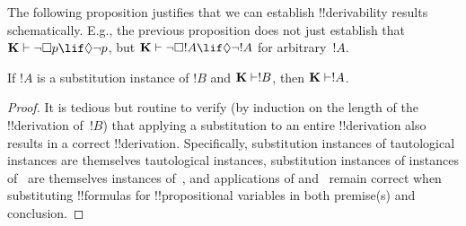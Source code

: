 \documentclass[../../../include/open-logic-section]{subfiles}
\begin{document}
The following proposition justifies that we can establish
!!{derivability} results schematically. E.g., the previous proposition
does not just establish that $\Log{K} \Proves \lnot\Box p \lif
\Diamond \lnot p$, but $\Log{K} \Proves \lnot\Box !A \lif \Diamond
\lnot !A$ for arbitrary~$!A$.

\begin{prop}
  If $!A$ is a substitution instance of $!B$ and $\Log{K} \Proves !B$,
  then $\Log{K} \Proves !A$.
\end{prop}

\begin{proof}
  It is tedious but routine to verify (by induction on the length of
  the !!{derivation} of~$!B$) that applying a substitution to an
  entire !!{derivation} also results in a correct
  !!{derivation}. Specifically, substitution instances of tautological
  instances are themselves tautological instances, substitution
  instances of instances of~
  are themselves instances of~, and applications of \MP{} and~\Nec{} remain correct
  when substituting !!{formula}s for !!{propositional variable}s in
  both premise(s) and conclusion.
\end{proof}
\end{document}
